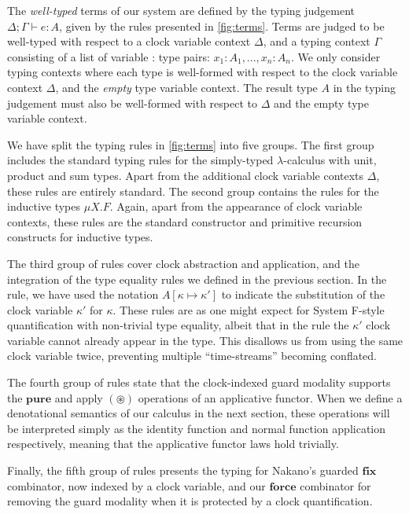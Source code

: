 \documentclass[natbib]{sigplanconf}
\newcommand{\kw}[1]{\textbf{#1}}
\begin{document}
The \emph{well-typed} terms of our system are defined by the typing judgement
$\Delta; \Gamma \vdash e : A$, given by the rules presented in
\autoref{fig:terms}. Terms are judged to be well-typed with respect to
a clock variable context $\Delta$, and a typing context $\Gamma$
consisting of a list of variable : type pairs: $x_1 : A_1, ..., x_n :
A_n$. We only consider typing contexts where each type is well-formed
with respect to the clock variable context $\Delta$, and the
\emph{empty} type variable context. The result type $A$ in the typing
judgement must also be well-formed with respect to $\Delta$ and the
empty type variable context.

We have split the typing rules in \autoref{fig:terms} into five
groups. The first group includes the standard typing rules for the
simply-typed $\lambda$-calculus with unit, product and sum
types. Apart from the additional clock variable contexts $\Delta$,
these rules are entirely standard. The second group contains the rules
for the inductive types $\mu X. F$. Again, apart from the appearance
of clock variable contexts, these rules are the standard constructor
and primitive recursion constructs for inductive types.

The third group of rules cover clock abstraction and application, and
the integration of the type equality rules we defined in the previous
section. In the  rule, we have used the notation
$A[\kappa \mapsto \kappa']$ to indicate the substitution of the clock
variable $\kappa'$ for $\kappa$. These rules are as one might expect
for System F-style quantification with non-trivial type equality,
albeit that in the  rule the $\kappa'$ clock
variable cannot already appear in the type. This disallows us from
using the same clock variable twice, preventing multiple
``time-streams'' becoming conflated.

The fourth group of rules state that the clock-indexed guard modality
supports the $\kw{pure}$ and apply $(\mathord\circledast)$ operations
of an applicative functor. When we define a denotational semantics of
our calculus in the next section, these operations will be interpreted
simply as the identity function and normal function application
respectively, meaning that the applicative functor laws hold
trivially.

Finally, the fifth group of rules presents the typing for Nakano's
guarded $\kw{fix}$ combinator, now indexed by a clock variable, and
our $\kw{force}$ combinator for removing the guard modality when it is
protected by a clock quantification.
\end{document}
